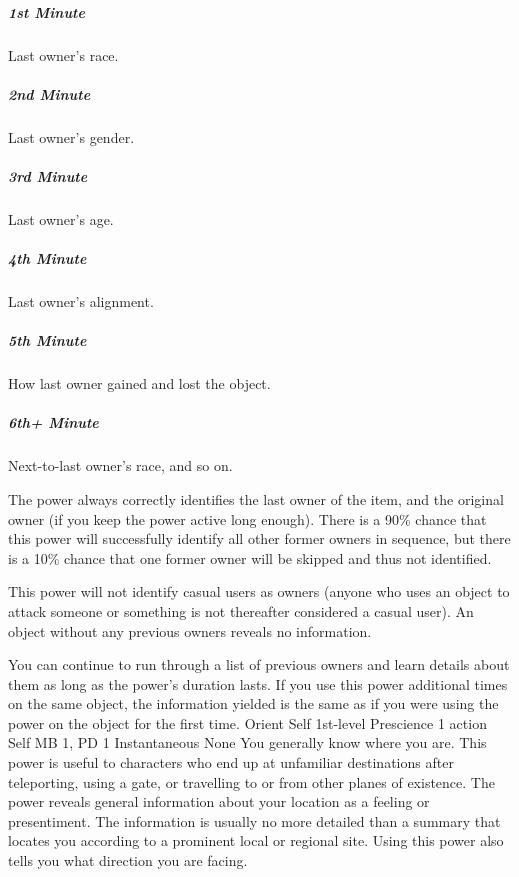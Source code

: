 \subparagraph{1st Minute}
  Last owner's race.
\subparagraph{2nd Minute}
  Last owner's gender.
\subparagraph{3rd Minute}
  Last owner's age.
\subparagraph{4th Minute}
  Last owner's alignment.
\subparagraph{5th Minute}
  How last owner gained and lost the object.
\subparagraph{6th+ Minute}
  Next-to-last owner's race, and so on.

The power always correctly identifies the last owner of the item,
and the original owner
(if you keep the power active long enough).
There is a 90\% chance
that this power will successfully identify all other former owners
in sequence,
but there is a 10\% chance that one former owner
will be skipped and thus not identified.

This power will not identify casual users as owners
(anyone who uses an object to attack someone
or something is not thereafter considered a casual user).
An object without any previous owners reveals no information.

You can continue to run through a list of previous owners
and learn details about them as long as the power's duration lasts.
If you use this power additional times on the same object,
the information yielded is the same
as if you were using the power on the object for the first time.
\DndPowerHeader%
    {Orient Self\label{pwr:orient_self}}
    {1st-level Prescience}
    {1 action}
    {Self}
    {MB 1, PD 1}
    {Instantaneous}
    {None}
You generally know where you are. This power
is useful to characters who end up at unfamiliar destinations
after teleporting, using a gate, or travelling to or from
other planes of existence. The power reveals general information
about your location as a feeling or presentiment. The information
is usually no more detailed than a summary that locates you
according to a prominent local or regional site. Using this
power also tells you what direction you are facing.


